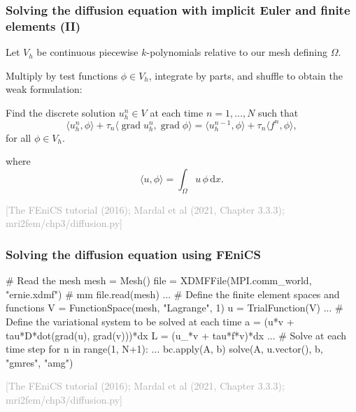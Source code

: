 \documentclass[mathserif, aspectratio=169]{beamer}
\DeclareMathOperator{\Grad}{\mathrm{grad}}
\newcommand{\inner}[2]{\langle #1,  #2\rangle}
\newcommand{\refer}[1]{\begin{flushright}{\tiny \textcolor{darkgray}{[#1]}}\end{flushright}}
\newcommand{\dx}{\, \mathrm{d}x}
\begin{document}
\begin{frame}
  \frametitle{Solving the diffusion equation with implicit Euler and finite elements (II)}

  Let $V_h$ be continuous piecewise $k$-polynomials relative to
  our mesh defining $\Omega$.

  \bigskip

  Multiply by test functions $\phi \in V_h$, integrate by parts, and
  shuffle to obtain the weak formulation:

  \bigskip
  
  Find the discrete solution $u_h^n \in V$ at each time $n = 1, \dots,
  N$ such that
  \begin{equation*}
    \inner{u_h^n}{\phi} + \tau_n \inner{\Grad u_h^n}{\Grad \phi}
    =  \inner{u_h^{n-1}}{\phi} + \tau_n \inner{f^n}{\phi},  
  \end{equation*}
  for all $\phi \in V_h$.
  
  \bigskip
  
  where
  \begin{equation*}
    \inner{u}{\phi} = \int_{\Omega} u \, \phi \dx.
  \end{equation*}
    \refer{The FEniCS tutorial (2016); Mardal et al (2021, Chapter 3.3.3); mri2fem/chp3/diffusion.py}
\end{frame}

\begin{frame}[fragile]
\frametitle{Solving the diffusion equation using FEniCS}

  \begin{python}
# Read the mesh
mesh = Mesh()
file = XDMFFile(MPI.comm_world, "ernie.xdmf") # mm 
file.read(mesh)
...
# Define the finite element spaces and functions
V = FunctionSpace(mesh, "Lagrange", 1)
u = TrialFunction(V)
...
# Define the variational system to be solved at each time
a = (u*v + tau*D*dot(grad(u), grad(v)))*dx
L = (u_*v + tau*f*v)*dx
...
# Solve at each time step
for n in range(1, N+1):
    ...
    bc.apply(A, b)
    solve(A, u.vector(), b, "gmres", "amg")
  \end{python}
  \vspace{-1em}
  \refer{The FEniCS tutorial (2016); Mardal et al (2021, Chapter 3.3.3); mri2fem/chp3/diffusion.py}

\end{frame}
\end{document}

